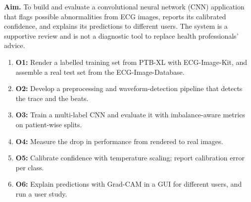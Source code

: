 \textbf{Aim.} To build and evaluate a convolutional neural network (CNN) application that
flags possible abnormalities from ECG images, reports its calibrated confidence, and explains its predictions to different users. The system is a supportive review and is not a diagnostic tool to replace health professionals' advice.

\begin{enumerate}\setlength{\itemsep}{0pt}\setlength{\parskip}{0pt}
  \item \textbf{O1:} Render a labelled training set from PTB-XL with ECG-Image-Kit, and assemble a real test set from the ECG-Image-Database.
  \item \textbf{O2:} Develop a preprocessing and waveform-detection pipeline that detects the trace and the beats.
  \item \textbf{O3:} Train a multi-label CNN and evaluate it with imbalance-aware metrics on patient-wise splits.
  \item \textbf{O4:} Measure the drop in performance from rendered to real images.
  \item \textbf{O5:} Calibrate confidence with temperature scaling; report calibration error per class.
  \item \textbf{O6:} Explain predictions with Grad-CAM in a GUI for different users, and run a user study.
\end{enumerate}